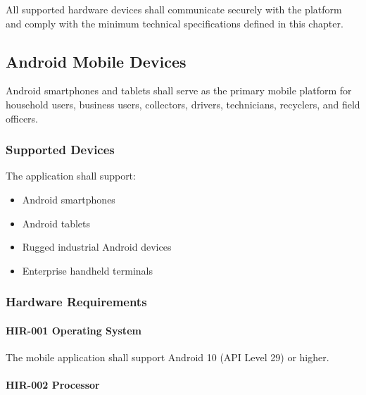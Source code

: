 All supported hardware devices shall communicate securely with the
platform and comply with the minimum technical specifications defined in
this chapter.


\subsection{Android Mobile Devices}

Android smartphones and tablets shall serve as the primary mobile
platform for household users, business users, collectors, drivers,
technicians, recyclers, and field officers.


\subsubsection*{Supported Devices}

The application shall support:

\begin{itemize}

\item Android smartphones

\item Android tablets

\item Rugged industrial Android devices

\item Enterprise handheld terminals

\end{itemize}


\subsubsection*{Hardware Requirements}

\paragraph{HIR-001 Operating System}

The mobile application shall support Android 10 (API Level 29) or
higher.

\paragraph{HIR-002 Processor}

